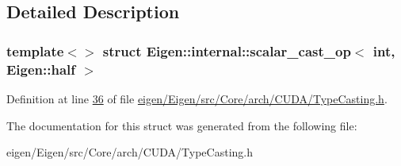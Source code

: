 \subsection{Detailed Description}
\subsubsection*{template$<$$>$\newline
struct Eigen\+::internal\+::scalar\+\_\+cast\+\_\+op$<$ int, Eigen\+::half $>$}



Definition at line \hyperlink{eigen_2_eigen_2src_2_core_2arch_2_c_u_d_a_2_type_casting_8h_source_l00036}{36} of file \hyperlink{eigen_2_eigen_2src_2_core_2arch_2_c_u_d_a_2_type_casting_8h_source}{eigen/\+Eigen/src/\+Core/arch/\+C\+U\+D\+A/\+Type\+Casting.\+h}.



The documentation for this struct was generated from the following file\+:\begin{DoxyCompactItemize}
\item 
eigen/\+Eigen/src/\+Core/arch/\+C\+U\+D\+A/\+Type\+Casting.\+h\end{DoxyCompactItemize}
